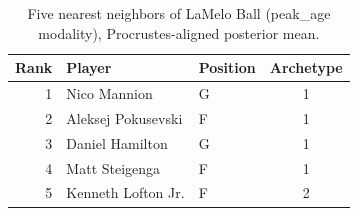 \begin{table}[htbp]
  \centering\small
  \begin{tabular}{rllc}
    \toprule
    Rank & Player & Position & Archetype \\
    \midrule
    1 & Nico Mannion & G & 1 \\
    2 & Aleksej Pokusevski & F & 1 \\
    3 & Daniel Hamilton & G & 1 \\
    4 & Matt Steigenga & F & 1 \\
    5 & Kenneth Lofton Jr. & F & 2 \\
    \bottomrule
  \end{tabular}
  \caption{Five nearest neighbors of LaMelo Ball (peak_age modality), Procrustes-aligned posterior mean.}
  \label{tab:LaMelo_Ball_neighbors_peak_age}
\end{table}

